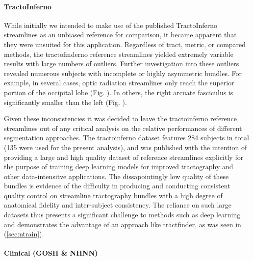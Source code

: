 \paragraph*{TractoInferno}


While initially we intended to make use of the published TractoInferno streamlines as an unbiased reference for comparison, it became apparent that they were unsuited for this application.
Regardless of tract, metric, or compared methods, the tractofinderno reference streamlines yielded extremely variable results with large numbers of outliers.
Further investigation into these outliers revealed numerous subjects with incomplete or highly asymmetric bundles.
For example, in several cases, optic radiation streamlines only reach the superior portion of the occipital lobe (Fig. ).
In others, the right arcuate fasciculus is significantly smaller than the left (Fig. ).

Given these inconsistencies it was decided to leave the tractoinferno reference streamlines out of any critical analysis on the relative performances of different segmentation approaches.
The tractoinferno dataset features 284 subjects in total (135 were used for the present analysis), and was published with the intention of providing a large and high quality dataset of reference streamlines explicitly for the purpose of training deep learning models for improved tractography and other data-intensitve applications.
The dissapointingly low quality of these bundles is evidence of the difficulty in producing and conducting consistent quality control on streamline tractography bundles with a high degree of anatomical fidelity and inter-subject consistency.
The reliance on such large datasets thus presents a significant challenge to methods such as deep learning and demonstrates the advantage of an approach like tractfinder, as was seen in (\ref{sec:ntrain}).

\paragraph*{Clinical (GOSH \& NHNN)}

